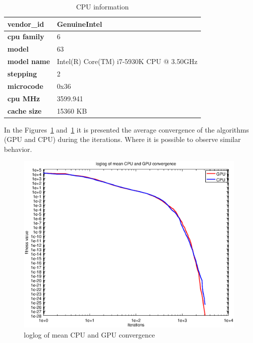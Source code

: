 \documentclass{article}
\begin{document}
	\begin{table}[!htb]
		\centering
		\caption{CPU information}
		\label{tbl:cpuinfo}
		\begin{tabular}{|l|l|}
			\hline
			\textbf{vendor\_id} & GenuineIntel                             \\ \hline
			\textbf{cpu family} & 6                                        \\ \hline
			\textbf{model}      & 63                                       \\ \hline
			\textbf{model name} & Intel(R) Core(TM) i7-5930K CPU @ 3.50GHz \\ \hline
			\textbf{stepping}   & 2                                        \\ \hline
			\textbf{microcode}  & 0x36                                     \\ \hline
			\textbf{cpu MHz}    & 3599.941                                 \\ \hline
			\textbf{cache size} & 15360 KB                                 \\ \hline
		\end{tabular}
	\end{table}

    In the Figures~\ref{fig:loglog_convergence} and~\ref{fig:loglog_convergence} it is presented the average convergence of the algorithms (GPU and CPU) during the iterations. Where it is possible to observe similar behavior.

    \begin{figure}[!htb]
        \centering
        \includegraphics[width=.7\textwidth]{../img/loglog_convergence.eps}
        \caption{loglog of mean CPU and GPU convergence}
        \label{fig:loglog_convergence}
    \end{figure}
\end{document}

